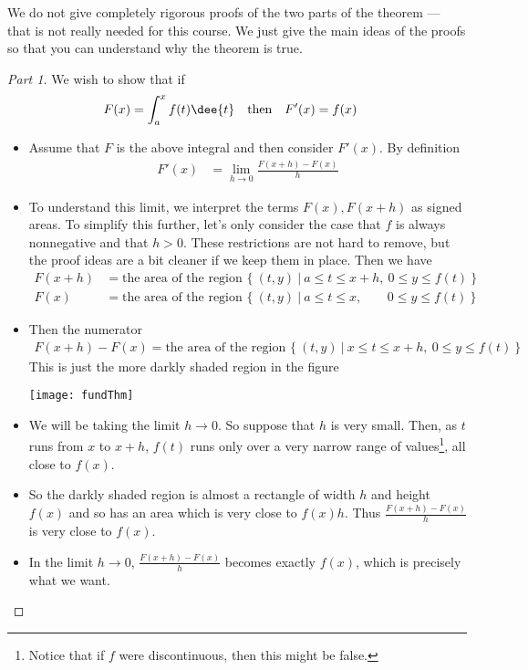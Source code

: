 We do not give completely rigorous proofs of the two parts of the theorem ---
that is not really needed for this course. We just give the main ideas of the
proofs so that you can understand why the theorem is true.
\begin{proof}[Part 1] We wish to show that if
\begin{align*}
  F(x) &= \int_a^x f(t) \dee{t} & \text{then}&&
  F'(x) &= f(x)
\end{align*}
\begin{itemize}
 \item Assume that $F$ is the above integral and then consider $F'(x)$. By
  definition
  \begin{align*}
  F'(x) &=\lim_{h\rightarrow 0} \frac{F(x+h)-F(x)}{h}
  \end{align*}

\item To understand this limit, we interpret the terms $F(x), F(x+h)$ as signed
areas. To simplify this further, let's only consider the case that $f$ is always
nonnegative and that $h>0$. These restrictions are not hard to remove, but the
proof ideas are a bit cleaner if we keep them in place. Then we have
\begin{align*}
F(x+h)&=\text{the area of the region $\big\{\ (t,y)\ \big|\ a\le t\le x+h,\
                0\le y\le f(t)\ \big\}$} \\
F(x)&=\text{the area of the region $\big\{\ (t,y)\ \big|\ a\le t\le x,
                  \phantom{+h\ \,}\
                                             0\le y\le f(t)\ \big\}$}
\end{align*}

\item Then the numerator
\begin{align*}
F(x+h)-F(x)=\text{the area of the region $\big\{\ (t,y)\ \big|\ x\le t\le x+h,\
                0\le y\le f(t)\ \big\}$}
\end{align*}
This is just the more darkly shaded region in the figure
\begin{efig}
\begin{center}
    \texttt{[image: fundThm]}
\end{center}
\end{efig}

\item We will be taking the limit $h\rightarrow 0$. So suppose that $h$ is
very small. Then, as $t$ runs from $x$ to $x+h$, $f(t)$ runs only over
a very narrow range of values\footnote{Notice that if $f$ were
discontinuous, then this might be false.}, all close to $f(x)$.

\item So the darkly shaded region is almost a rectangle of width $h$ and height
$f(x)$ and so has an area which is very close to $f(x)h$. Thus
$\frac{F(x+h)-F(x)}{h}$ is very close to $f(x)$.
\item In the limit $h\rightarrow 0$, $\frac{F(x+h)-F(x)}{h}$ becomes
exactly $f(x)$, which is precisely what we want.
\end{itemize}
\end{proof}
